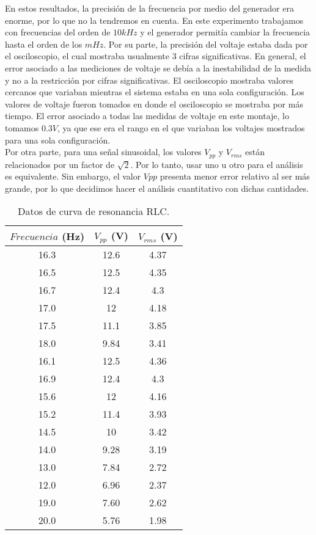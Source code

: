 \documentclass[%
 reprint,
 amsmath,amssymb,
 aps,
]{revtex4-1}
\begin{document}
En estos resultados, la precisi\'on de la frecuencia por medio del generador era enorme, por lo que no la tendremos en cuenta. En este experimento trabajamos con frecuencias del orden de $10kHz$ y el generador permit\'ia cambiar la frecuencia hasta el orden de los $mHz$. Por su parte, la precisi\'on del voltaje estaba dada por el osciloscopio, el cual mostraba usualmente 3 cifras significativas. En general, el error asociado a las mediciones de voltaje se deb\'ia a la inestabilidad de la medida y no a la restricci\'on por cifras significativas. El osciloscopio mostraba valores cercanos que variaban mientras el sistema estaba en una sola configuraci\'on. Los valores de voltaje fueron tomados en donde el osciloscopio se mostraba por m\'as tiempo. El error asociado a todas las medidas de voltaje en este montaje, lo tomamos $0.3V$, ya que ese era el rango en el que variaban los voltajes mostrados para una sola configuraci\'on.\\

Por otra parte, para una señal sinusoidal, los valores $V_{pp}$ y $V_{rms}$ est\'an relacionados por un factor de $\sqrt{2}$. Por lo tanto, usar uno u otro para el an\'alisis es equivalente. Sin embargo, el valor $V{pp}$ presenta menor error relativo al ser m\'as grande, por lo que decidimos hacer el an\'alisis cuantitativo con dichas cantidades.\\

\begin{table}[h!]
\centering
 \begin{tabular}{|c|c|c|} 
 \hline
 $Frecuencia$ (Hz) & $V_{pp}$ (V) & $V_{rms}$ (V) \\ [0.5ex] 
 \hline\hline
16.3 &		12.6 &		4.37\\
16.5 &		12.5 &		4.35\\
16.7 &		12.4 &		4.3\\
17.0 &		12 &		4.18\\
17.5 &		11.1 &		3.85\\
18.0 &		9.84 &		3.41\\
16.1 &		12.5 &		4.36\\
16.9 &		12.4 &		4.3\\
15.6 &		12 &		4.16\\
15.2 &		11.4 &		3.93\\
14.5 &		10 &		3.42\\
14.0 &		9.28 &		3.19\\
13.0 &		7.84 &		2.72\\
12.0 &		6.96 &		2.37\\
19.0 &		7.60 &		2.62\\
20.0 &		5.76 &		1.98\\
[1ex] 
 \hline
 \end{tabular}
 \caption{Datos de curva de resonancia RLC.}
 \label{table:resonancia}
\end{table}
\end{document}
